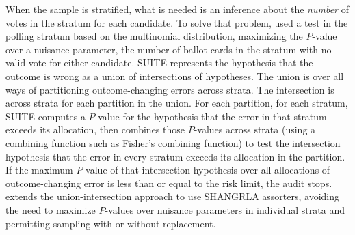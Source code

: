 \documentclass[aoas]{imsart}
\begin{document}
When the sample is stratified, what is needed is an inference about the \emph{number} of votes in the stratum for each candidate.
To solve that problem, \citet{ottoboniEtal18} used a test in the polling stratum based on the multinomial distribution, 
maximizing the $P$-value over a nuisance parameter, the number of ballot cards in the stratum with no valid vote for either candidate.
SUITE represents the hypothesis that the outcome is wrong as a union of intersections of hypotheses.
The union is over all ways of partitioning outcome-changing errors across strata.
The intersection is across strata for each partition in the union.
For each partition, for each stratum, SUITE computes a $P$-value for the hypothesis that the error in that stratum
exceeds its allocation, then combines those $P$-values across strata (using a combining
function such as Fisher's combining function) to test the intersection hypothesis that the error in 
every stratum exceeds its allocation in the partition.
If the maximum $P$-value of that intersection hypothesis over all allocations of outcome-changing error is less
than or equal to the risk limit, the audit stops. 
\citet{stark20} extends the union-intersection approach to use SHANGRLA assorters,
avoiding the need to maximize $P$-values over nuisance parameters in individual strata and
permitting sampling with or without replacement.
\end{document}
